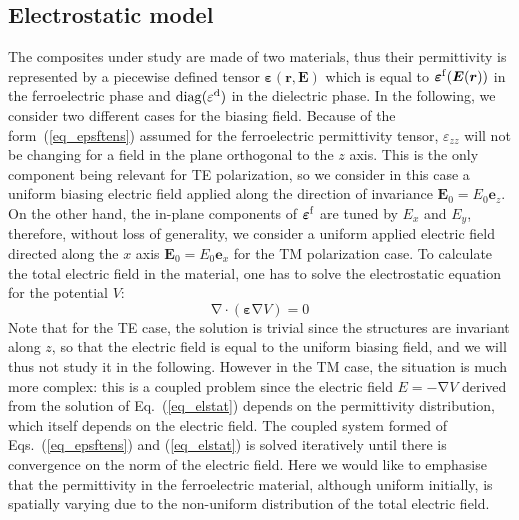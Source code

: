 \documentclass[openacc]{rsproca_new}%
\newcommand{\B}{\boldsymbol}
\newcommand{\tens}[1]{\B{#1}}
\newcommand{\grad}{\B{\mathrm{\nabla}}}
\renewcommand{\div}{\B{\mathrm{\nabla\cdotp}}}
\newcommand{\epsftens}{\tens{\varepsilon}^{\rm f}}
\newcommand{\epstens}{\tens{\varepsilon}}
\newcommand{\epsd}{\varepsilon^{\rm d}}
\newcommand{\equ}[1]{Eq.~(\ref{#1})}
\begin{document}
\subsection{Electrostatic model}
The composites under study are made of two materials, thus their permittivity
is represented by a piecewise defined tensor $\epstens(\B r, \B E)$ which is
equal to $\epsftens(\B E(\B r))$ in the ferroelectric phase and ${\rm diag}(\epsd)$
in the dielectric phase.
In the following, we consider two different cases for the biasing field.
Because of the form~(\ref{eq_epsftens}) assumed for the ferroelectric permittivity
tensor, $\varepsilon_{zz}$ will not be changing for a field in the plane orthogonal
to the $z$ axis. This is the only component
being relevant for TE polarization, so we consider in this case a uniform biasing
electric field applied along the direction of invariance $\B E_0 = E_{0} \B e_z$.
On the other hand,
the in-plane components of $\epsftens$ are tuned by $E_x$ and $E_y$, therefore,
without loss of generality,
we consider a uniform applied electric field directed along the $x$ axis
$\B E_0 = E_{0} \B e_x$ for the TM polarization case.
To calculate the total electric field in the material, one
has to solve the electrostatic equation for the potential $V$:
\begin{equation}
 \div (\epstens \grad V) = 0
 \label{eq_elstat}
\end{equation}
Note that for the TE case, the solution is trivial since the structures
are invariant along $z$, so that the electric field is equal to the uniform biasing field, and
we will thus not study it in the following.
However in the TM case, the situation is much more complex: this is a coupled problem since the
electric field $E=-\grad V$ derived from the
solution of \equ{eq_elstat} depends on the permittivity distribution, which
itself depends on the electric field.
The coupled system formed
of Eqs.~(\ref{eq_epsftens}) and (\ref{eq_elstat}) is solved iteratively until there
is convergence on the norm of the electric field.
Here we would like to emphasise that the permittivity in the ferroelectric material, although
uniform initially, is spatially varying due to the non-uniform distribution
of the total electric field.\\

\end{document}
